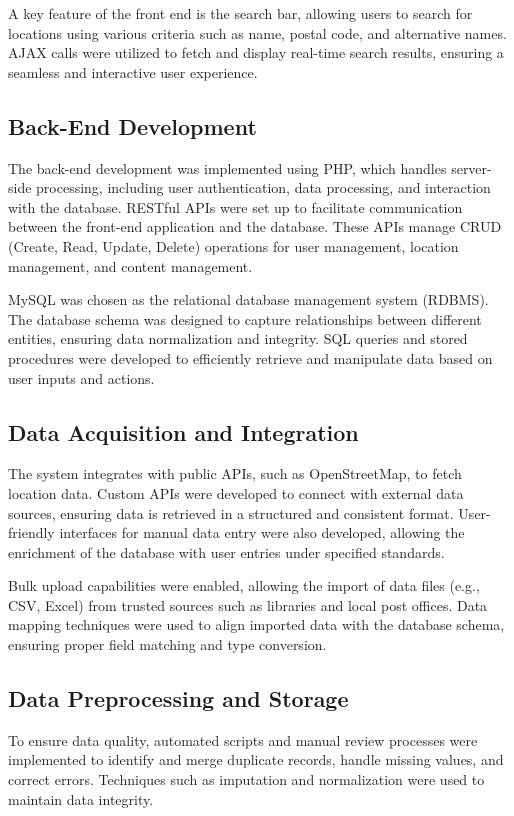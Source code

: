 A key feature of the front end is the search bar, allowing users to search for locations using various criteria such as name, postal code, and alternative names. AJAX calls were utilized to fetch and display real-time search results, ensuring a seamless and interactive user experience.

\subsection{Back-End Development}
The back-end development was implemented using PHP, which handles server-side processing, including user authentication, data processing, and interaction with the database. RESTful APIs were set up to facilitate communication between the front-end application and the database. These APIs manage CRUD (Create, Read, Update, Delete) operations for user management, location management, and content management.

MySQL was chosen as the relational database management system (RDBMS). The database schema was designed to capture relationships between different entities, ensuring data normalization and integrity. SQL queries and stored procedures were developed to efficiently retrieve and manipulate data based on user inputs and actions.

\subsection{Data Acquisition and Integration}
The system integrates with public APIs, such as OpenStreetMap, to fetch location data. Custom APIs were developed to connect with external data sources, ensuring data is retrieved in a structured and consistent format. User-friendly interfaces for manual data entry were also developed, allowing the enrichment of the database with user entries under specified standards.

Bulk upload capabilities were enabled, allowing the import of data files (e.g., CSV, Excel) from trusted sources such as libraries and local post offices. Data mapping techniques were used to align imported data with the database schema, ensuring proper field matching and type conversion.

\subsection{Data Preprocessing and Storage}
To ensure data quality, automated scripts and manual review processes were implemented to identify and merge duplicate records, handle missing values, and correct errors. Techniques such as imputation and normalization were used to maintain data integrity.

